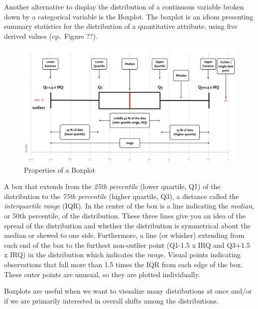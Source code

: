 \documentclass[
]{book}
\begin{document}
Another alternative to display the distribution of a continuous variable broken down by a categorical variable is the Boxplot. The boxplot is an idiom presenting summary statistics for the distribution of a quantitative attribute, using five derived values (cp.~Figure ??).

\begin{figure}

{\centering \includegraphics[width=1\linewidth]{images/boxplot} 

}

\caption{Properties of a Boxplot}\label{fig:unnamed-chunk-7}
\end{figure}

A box that extends from the \emph{25th percentile} (lower quartile, Q1) of the distribution to the \emph{75th percentile} (higher quartile, Q3), a distance called the \emph{interquartile range} (IQR). In the center of the box is a line indicating the \emph{median}, or 50th percentile, of the distribution. These three lines give you an idea of the spread of the distribution and whether the distribution is symmetrical about the median or skewed to one side. Furthermore, a line (or whisker) extending from each end of the box to the furthest non-outlier point (Q1-1.5 x IRQ and Q3+1.5 x IRQ) in the distribution which indicates the \emph{range}. Visual points indicating observations that fall more than 1.5 times the IQR from each edge of the box. These outer points are unusual, so they are plotted individually.

Boxplots are useful when we want to visualize many distributions at once and/or if we are primarily interested in overall shifts among the distributions.
\end{document}
